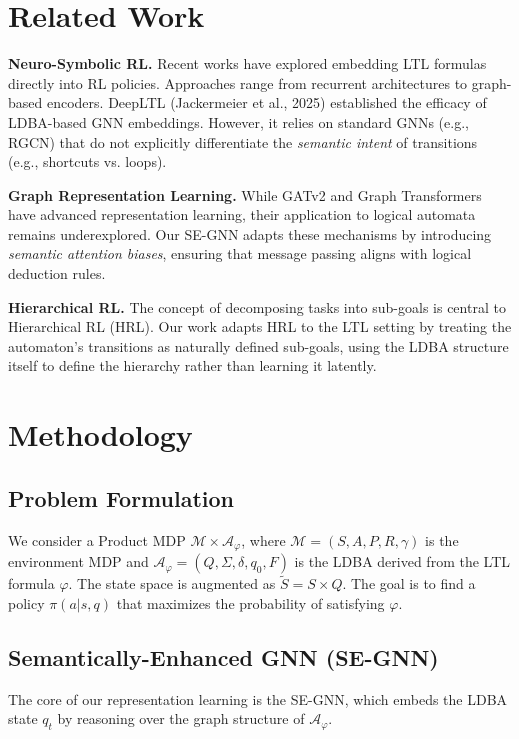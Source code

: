 \documentclass{article}
\begin{document}
\section{Related Work}
\textbf{Neuro-Symbolic RL.} Recent works have explored embedding LTL formulas directly into RL policies. Approaches range from recurrent architectures to graph-based encoders. DeepLTL (Jackermeier et al., 2025) established the efficacy of LDBA-based GNN embeddings. However, it relies on standard GNNs (e.g., RGCN) that do not explicitly differentiate the \textit{semantic intent} of transitions (e.g., shortcuts vs. loops).

\textbf{Graph Representation Learning.} While GATv2 and Graph Transformers have advanced representation learning, their application to logical automata remains underexplored. Our SE-GNN adapts these mechanisms by introducing \textit{semantic attention biases}, ensuring that message passing aligns with logical deduction rules.

\textbf{Hierarchical RL.} The concept of decomposing tasks into sub-goals is central to Hierarchical RL (HRL). Our work adapts HRL to the LTL setting by treating the automaton's transitions as naturally defined sub-goals, using the LDBA structure itself to define the hierarchy rather than learning it latently.

\section{Methodology}

\subsection{Problem Formulation}
We consider a Product MDP $\mathcal{M} \times \mathcal{A}_\varphi$, where $\mathcal{M} = (S, A, P, R, \gamma)$ is the environment MDP and $\mathcal{A}_\varphi = (Q, \Sigma, \delta, q_0, F)$ is the LDBA derived from the LTL formula $\varphi$. The state space is augmented as $\tilde{S} = S \times Q$. The goal is to find a policy $\pi(a|s, q)$ that maximizes the probability of satisfying $\varphi$.

\subsection{Semantically-Enhanced GNN (SE-GNN)}
The core of our representation learning is the SE-GNN, which embeds the LDBA state $q_t$ by reasoning over the graph structure of $\mathcal{A}_\varphi$.
\end{document}
